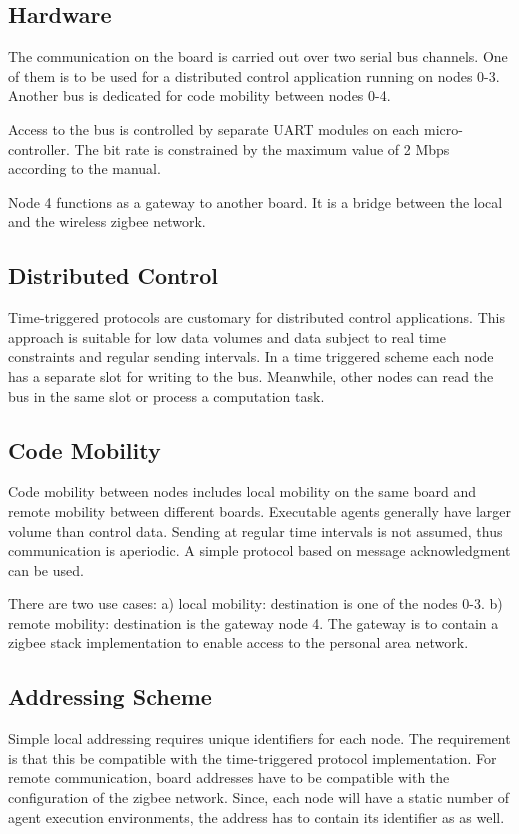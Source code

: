 \documentclass{scrreprt}
\begin{document}
\subsection{Hardware}

The communication on the board is carried out
over two serial bus channels. One of them is to be used for a distributed control
application running on nodes 0-3. Another bus is dedicated for code mobility between nodes 0-4.

Access to the bus is controlled by separate UART modules on each
micro-controller. The bit rate is constrained by the maximum value of 2 Mbps according to the manual.  

Node 4 functions as a gateway to another board. It is a bridge between the local
and the wireless zigbee network.

\subsection{Distributed Control} 
Time-triggered protocols are customary for distributed control applications.
This approach is suitable for low data volumes and data subject to real time
constraints and regular sending intervals. 
In a time triggered scheme each node has a separate slot for writing to the bus.
Meanwhile, other nodes can read the bus in the same slot or process a computation task.


\subsection{Code Mobility}
Code mobility between nodes includes local mobility on the same board and
remote mobility between different boards. Executable agents generally have
larger volume than control data. Sending at regular time intervals is not assumed,
thus communication is aperiodic.
A simple protocol based on message acknowledgment can be used. 

There are two use cases: a) local mobility: destination is one of the nodes 0-3.
b) remote mobility: destination is the gateway node 4. 
The gateway is to contain a zigbee stack implementation to enable 
access to the personal area network.

\subsection{Addressing Scheme}
Simple local addressing requires unique identifiers for
each node. The requirement is that this be compatible with the time-triggered protocol
implementation. For remote communication, board addresses have to be compatible
with the configuration of the zigbee network. Since, each node will have a static 
number of agent execution environments, the address has to contain its
identifier as as well.  
\end{document}
